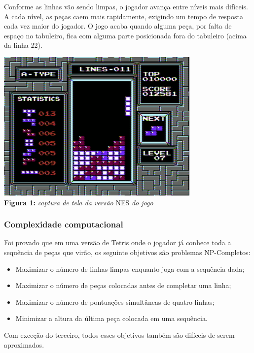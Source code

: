 \documentclass[conference]{IEEEtran}
\begin{document}
Conforme as linhas vão sendo limpas, o jogador avança entre níveis mais difíceis. A cada nível, as peças caem mais rapidamente, exigindo um tempo de resposta cada vez maior do jogador. O jogo acaba quando alguma peça, por falta de espaço no tabuleiro, fica com alguma parte posicionada fora do tabuleiro (acima da linha 22).

\begin{center}
\includegraphics[scale=0.5]{tetris_nes.png}\\

\textbf{Figura 1:} \textit{captura de tela da versão} NES \textit{do jogo}
\end{center}

\subsubsection{Complexidade computacional}
Foi provado \cite{b2} que em uma versão de Tetris onde o jogador já conhece toda a sequência de peças que virão, os seguinte objetivos são problemas NP-Completos:
\begin{itemize}
\item Maximizar o número de linhas limpas enquanto joga com a sequência dada;

\item Maximizar o número de peças colocadas antes de completar uma linha;

\item Maximizar o número de pontuações simultâneas de quatro linhas;

\item Minimizar a altura da última peça colocada em uma sequência.

\end{itemize}

Com exceção do terceiro, todos esses objetivos também são difíceis de serem aproximados. 
\end{document}
